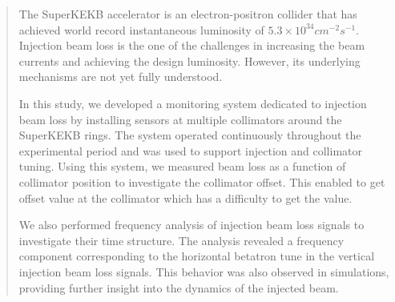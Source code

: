 \begin{abstract}

The SuperKEKB accelerator is an electron-positron collider that has achieved world record instantaneous luminosity of $5.3 \times 10^{34}cm^{-2}s^{-1}$. Injection beam loss is the one of the challenges in increasing the beam currents and achieving the design luminosity. However, its underlying mechanisms are not yet fully understood.

In this study, we developed a monitoring system dedicated to injection beam loss by installing sensors at multiple collimators around the SuperKEKB rings. The system operated continuously throughout the experimental period and was used to support injection and collimator tuning. Using this system, we measured beam loss as a function of collimator position to investigate the collimator offset. This enabled to get offset value at the collimator which has a difficulty to get the value. 

We also performed frequency analysis of injection beam loss signals to investigate their time structure. The analysis revealed a frequency component corresponding to the horizontal betatron tune in the vertical injection beam loss signals. This behavior was also observed in simulations, providing further insight into the dynamics of the injected beam. 

\end{abstract}